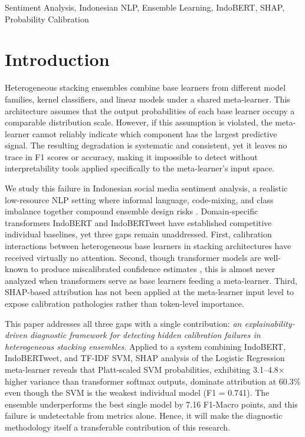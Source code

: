 \documentclass[conference]{IEEEtran}
\begin{document}
\begin{IEEEkeywords}
Sentiment Analysis, Indonesian NLP, Ensemble Learning, IndoBERT, SHAP, Probability Calibration
\end{IEEEkeywords}

\section{Introduction}

Heterogeneous stacking ensembles combine base learners from different model families, kernel classifiers, and linear models under a shared meta-learner. This architecture assumes that the output probabilities of each base learner occupy a comparable distribution scale. However, if this assumption is violated, the meta-learner cannot reliably indicate which component has the largest predictive signal. The resulting degradation is systematic and consistent, yet it leaves no trace in F1 scores or accuracy, making it impossible to detect without interpretability tools applied specifically to the meta-learner's input space.

We study this failure in Indonesian social media sentiment analysis, a realistic low-resource NLP setting \cite{b25} where informal language, code-mixing, and class imbalance together compound ensemble design risks \cite{b2,b5}. Domain-specific transformers IndoBERT \cite{b3} and IndoBERTweet \cite{b4} have established competitive individual baselines, yet three gaps remain unaddressed. First, calibration interactions between heterogeneous base learners in stacking architectures have received virtually no attention. Second, though transformer models are well-known to produce miscalibrated confidence estimates \cite{b15}, this is almost never analyzed when transformers serve as base learners feeding a meta-learner. Third, SHAP-based attribution has not been applied at the meta-learner input level to expose calibration pathologies rather than token-level importance.

This paper addresses all three gaps with a single contribution: \textit{an explainability-driven diagnostic framework for detecting hidden calibration failures in heterogeneous stacking ensembles}. Applied to a system combining IndoBERT, IndoBERTweet, and TF-IDF SVM, SHAP analysis of the Logistic Regression meta-learner reveals that Platt-scaled SVM probabilities, exhibiting 3.1--4.8$\times$ higher variance than transformer softmax outputs, dominate attribution at 60.3\% even though the SVM is the weakest individual model (F1 = 0.741). The ensemble underperforms the best single model by 7.16 F1-Macro points, and this failure is undetectable from metrics alone. Hence, it will make the diagnostic methodology itself a transferable contribution of this research.
\end{document}
